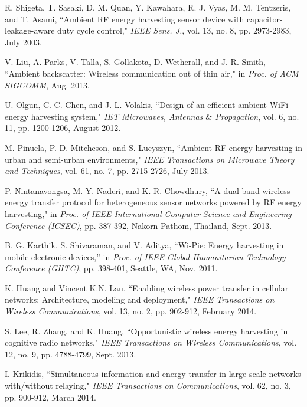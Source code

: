 \documentclass[12pt,draftclsnofoot,onecolumn]{IEEEtran}
\begin{document}
\begin{thebibliography}{99}
R. Shigeta, T. Sasaki, D. M. Quan, Y. Kawahara, R. J. Vyas, M. M. Tentzeris, and T. Asami, ``Ambient RF energy harvesting sensor device with capacitor-leakage-aware duty cycle control," \emph{IEEE Sens. J.}, vol. 13, no. 8, pp. 2973-2983, July 2003.

V. Liu, A. Parks, V. Talla, S. Gollakota, D. Wetherall, and J. R. Smith, ``Ambient backscatter: Wireless communication out of thin air," in \emph{Proc. of ACM SIGCOMM}, Aug. 2013.

 
U. Olgun, C.-C. Chen, and J. L. Volakis, ``Design of an efficient ambient WiFi energy harvesting system," \emph{IET Microwaves, Antennas $\&$ Propagation}, vol. 6, no. 11, pp. 1200-1206, August 2012. 

 
M. Pinuela, P. D. Mitcheson, and S. Lucyszyn, ``Ambient RF energy harvesting in urban and semi-urban environments," \emph{IEEE Transactions on Microwave Theory and Techniques}, vol. 61, no. 7, pp. 2715-2726, July 2013. 
 


P. Nintanavongsa, M. Y. Naderi, and K. R. Chowdhury, ``A dual-band wireless energy transfer protocol for heterogeneous sensor networks powered by RF energy harvesting," in \emph{Proc. of IEEE International Computer Science and Engineering Conference (ICSEC)}, pp. 387-392,
Nakorn Pathom, Thailand, Sept. 2013. 
 
 
B. G. Karthik, S. Shivaraman, and V. Aditya, ``Wi-Pie: Energy harvesting in mobile electronic devices,” in \emph{Proc. of IEEE Global Humanitarian Technology Conference (GHTC)}, pp. 398-401, Seattle, WA, Nov. 2011. 

K. Huang and Vincent K.N. Lau, ``Enabling wireless power transfer in cellular networks: Architecture, modeling and deployment," \emph{IEEE Transactions on Wireless Communications}, vol. 13, no. 2, pp. 902-912, February 2014. 

S. Lee, R. Zhang, and K. Huang, ``Opportunistic wireless energy harvesting in cognitive radio networks," \emph{IEEE Transactions on Wireless Communications},  vol. 12, no. 9, pp. 4788-4799,
Sept. 2013.

I. Krikidis, ``Simultaneous information and energy transfer in large-scale networks with/without relaying," \emph{IEEE Transactions on Communications}, vol. 62, no. 3, pp. 900-912, March 2014. 


\end{thebibliography}
\end{document}

